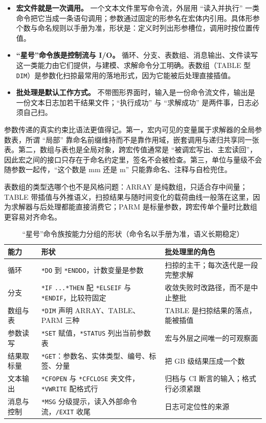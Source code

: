 \documentclass[12pt,a4paper,fontset=fandol]{ctexbook}
\newcommand{\Tp}[1]{\texttt{#1}}
\begin{document}
\begin{itemize}
\item \textbf{宏文件就是一次调用。} 一个文本文件里写命令流，外层用 ``读入并执行'' 一类命令把它当成一条语句调用；参数通过固定的形参名在宏体内引用。具体形参个数与命名规则以手册为准，形状是：定义时列出形参槽位，调用时按位置传值。
\item \textbf{``星号''命令族是控制流与 I/O。} 循环、分支、表数组、消息输出、文件读写这一类能力由它们提供，与建模、求解命令分工明确。表数组（TABLE 型 \Tp{DIM}）是参数化扫掠最常用的落地形式，因为它能被后处理直接插值。
\item \textbf{批处理是默认工作方式。} 不带图形界面时，输入是一份命令流文件，输出是一份文本日志加若干结果文件；``执行成功'' 与 ``求解成功'' 是两件事，日志必须自己扫。
\end{itemize}

参数传递的真实约束比语法更值得记。第一，宏内可见的变量属于求解器的全局参数表，所谓 ``局部'' 靠命名前缀维持而不是靠作用域，嵌套调用与递归共享同一张表。第二，数组与表也是全局对象，跨宏传值通常是 ``被调宏写出、主宏读回''，因此宏之间的接口只存在于命名约定里，签名不会被检查。第三，单位与量级不会随参数一起传，``这个数是 mm 还是 m'' 只能靠命名、注释与自检兜住。

表数组的类型选哪个也不是风格问题：ARRAY 是纯数组，只适合存中间量；TABLE 带插值与外推语义，扫掠结果与随时间变化的载荷曲线一般落在这里，因为求解器与后处理都能直接消费它；PARM 是标量参数，跨宏传单个量时比数组更容易对齐命名。

\begin{table}[htbp]
\centering
\caption{``星号''命令族按能力分组的形状（命令名以手册为准，语义长期稳定）}
\label{tab:ch02-starfamily}
\begin{tabular}{>{\raggedright\arraybackslash}p{}
                >{\raggedright\arraybackslash}p{}
                >{\raggedright\arraybackslash}p{}}
\toprule
\textbf{能力} & \textbf{形状} & \textbf{批处理里的角色} \\
\midrule
循环 & \Tp{*DO} 到 \Tp{*ENDDO}，计数变量是参数 & 扫掠的主干；每次迭代是一段完整求解 \\
分支 & \Tp{*IF} \Tp{...*THEN} 配 \Tp{*ELSEIF} 与 \Tp{*ENDIF}，比较符固定 & 收敛失败时改路径，而不是中止整批 \\
数组与表 & \Tp{*DIM} 声明 ARRAY、TABLE、PARM 三种 & TABLE 是扫掠结果的落点，能被插值 \\
参数读写 & \Tp{*SET} 赋值，\Tp{*STATUS} 列出当前参数表 & 宏与外层之间唯一的可观察面 \\
结果取标量 & \Tp{*GET}：参数名、实体类型、编号、标签、分量 & 把 GB 级结果压成一个数 \\
文本输出 & \Tp{*CFOPEN} 与 \Tp{*CFCLOSE} 夹文件，\Tp{*VWRITE} 配格式行 & 归档与 CI 断言的输入；格式行必须紧跟 \\
消息与控制 & \Tp{*MSG} 分级提示，读入外部命令流，\Tp{/EXIT} 收尾 & 日志可定位性的来源 \\
\bottomrule
\end{tabular}
\end{table}
\end{document}

